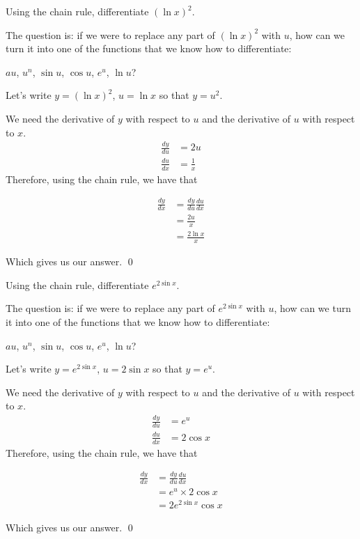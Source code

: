 \begin{example}
    Using the chain rule, differentiate $(\ln x)^2$.
\end{example}
\begin{solution}
    The question is: if we were to replace any part of $(\ln x)^2$ with $u$, how can we turn it into one of the functions that we know how to differentiate:
    
    $au$, $u^n$, $\sin u$, $\cos u$, $e^u$, $\ln u$?

    Let's write $y = (\ln x)^2$, $u = \ln x$ so that $y = u^2$.

    We need the derivative of $y$ with respect to $u$ and the derivative of $u$ with respect to $x$.
    \begin{align*}
        \frac{dy}{du} &= 2u \tag{using the derivative of $u^2$} \\
        \frac{du}{dx} &= \frac{1}{x} \tag{using the derivative of $\ln x$}
    \end{align*}
    Therefore, using the chain rule, we have that 

    \begin{align*}
        \frac{dy}{dx} &= \frac{dy}{du} \frac{du}{dx} \\
         &= \frac{2u}{x} \tag{substituting our workings} \\
         &= \frac{2\ln x}{x} \tag{using $u = \ln x$}
    \end{align*}

    Which gives us our answer.
    \qed
\end{solution}

\begin{example}
    Using the chain rule, differentiate $e^{2\sin x}$.
\end{example}
\begin{solution}
    The question is: if we were to replace any part of $e^{2\sin x}$ with $u$, how can we turn it into one of the functions that we know how to differentiate:
    
    $au$, $u^n$, $\sin u$, $\cos u$, $e^u$, $\ln u$?

    Let's write $y = e^{2\sin x}$, $u = 2\sin x$ so that $y = e^u$.

    We need the derivative of $y$ with respect to $u$ and the derivative of $u$ with respect to $x$.
    \begin{align*}
        \frac{dy}{du} &= e^u \tag{using the derivative of $e^u$} \\
        \frac{du}{dx} &= 2\cos x \tag{using the derivative of $2\sin x$}
    \end{align*}
    Therefore, using the chain rule, we have that 

    \begin{align*}
        \frac{dy}{dx} &= \frac{dy}{du} \frac{du}{dx} \\
         &= e^u \times 2\cos x  \tag{substituting our workings} \\
         &= 2e^{2\sin x}\cos x \tag{using $u = 2\sin x$}
    \end{align*}

    Which gives us our answer.
    \qed
\end{solution}

